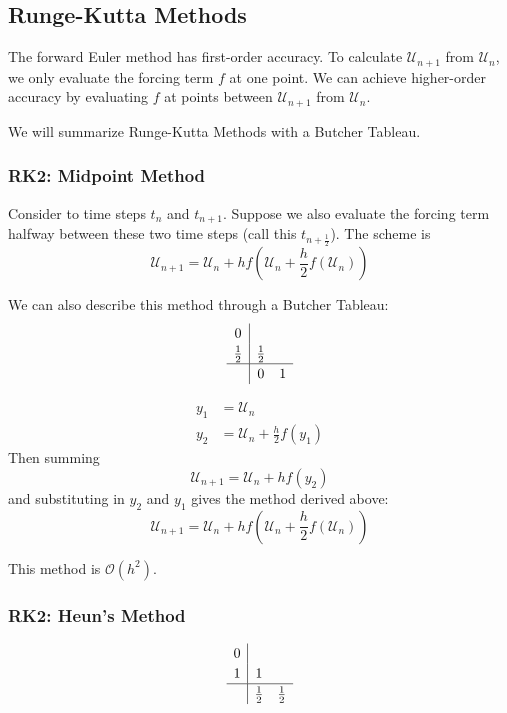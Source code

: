 \documentclass[12pt]{article}
\theoremstyle{definition}
\newcommand{\U}{\mathcal{U}}
\theoremstyle{definition}
\begin{document}
\subsection{Runge-Kutta Methods}
The forward Euler method has first-order accuracy. To calculate $\U_{n+1}$ from $\U_n$, we only evaluate the forcing term $f$ at one point. We can achieve higher-order accuracy by evaluating $f$ at points between $\U_{n+1}$ from $\U_n$.

We will summarize Runge-Kutta Methods with a Butcher Tableau.

\subsubsection{RK2: Midpoint Method}
Consider to time steps $t_n$ and $t_{n+1}$. Suppose we also evaluate the forcing term halfway between these two time steps (call this $t_{n+\frac{1}{2}}$). The scheme is
\begin{equation}
	\U_{n+1} = \U_n + h f\left(\U_n + \frac{h}{2}f(\U_n)\right)
\end{equation}

We can also describe this method through a Butcher Tableau:
\begin{equation}
	\renewcommand\arraystretch{1.2}
	\begin{array}
	{c|cc}
	0\\
	\frac{1}{2} & \frac{1}{2}\\
	\hline
	& 0 & 1
	\end{array}
\end{equation}

\begin{align*}
	y_1 &= \U_n \\
	y_2 &= \U_n + \frac{h}{2}f(y_1) 
\end{align*}
Then summing 
\begin{equation}
	\U_{n+1} = \U_n + h f(y_2)
\end{equation}
and substituting in $y_2$ and $y_1$ gives the method derived above:
\begin{equation}
	\U_{n+1} = \U_n + h f\left(\U_n + \frac{h}{2}f(\U_n)\right)
\end{equation}

This method is $\mathcal{O}(h^2)$. 

\subsubsection{RK2: Heun's Method}
\begin{equation}
	\renewcommand\arraystretch{1.2}
	\begin{array}
	{c|cc}
	0\\
	1 & 1\\
	\hline
	& \frac{1}{2} & \frac{1}{2}
	\end{array}
\end{equation}
\end{document}
